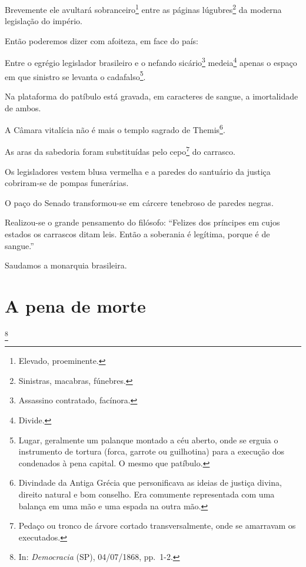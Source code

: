 Brevemente ele avultará sobranceiro\footnote{Elevado, proeminente.}
entre as páginas lúgubres\footnote{Sinistras, macabras, fúnebres.} da
moderna legislação do império.

Então poderemos dizer com afoiteza, em face do país:

Entre o egrégio legislador brasileiro e o nefando sicário\footnote{
  Assassino contratado, facínora.} medeia\footnote{Divide.} apenas o
espaço em que sinistro se levanta o cadafalso\footnote{Lugar,
  geralmente um palanque montado a céu aberto, onde se erguia o
  instrumento de tortura (forca, garrote ou guilhotina) para a execução
  dos condenados à pena capital. O mesmo que patíbulo.}.

Na plataforma do patíbulo está gravada, em caracteres de sangue, a
imortalidade de ambos.

A Câmara vitalícia não é mais o templo sagrado de Themis\footnote{
  Divindade da Antiga Grécia que personificava as ideias de justiça
  divina, direito natural e bom conselho. Era comumente representada com
  uma balança em uma mão e uma espada na outra mão.}.

As aras da sabedoria foram substituídas pelo cepo\footnote{Pedaço ou
  tronco de árvore cortado transversalmente, onde se amarravam os
  executados.} do carrasco.

Os legisladores vestem blusa vermelha e a paredes do santuário da
justiça cobriram-se de pompas funerárias.

O paço do Senado transformou-se em cárcere tenebroso de paredes negras.

Realizou-se o grande pensamento do filósofo: ``Felizes dos príncipes em
cujos estados os carrascos ditam leis. Então a soberania é legítima,
porque é de sangue.''

Saudamos a monarquia brasileira.

\chapter{A pena de morte}\footnote{In: \emph{Democracia} (SP), 04/07/1868,
  pp.~1-2.}

